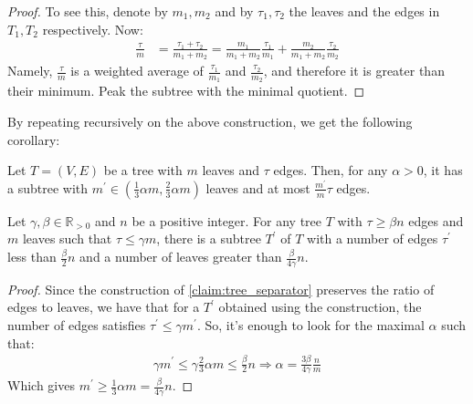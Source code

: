 \begin{proof}
To see this, denote by $m_{1},m_{2}$ and by $ \tau_{1}, \tau_{2} $ the leaves and the edges in $T_{1},T_{2}$ respectively. Now:
\begin{equation*}
  \begin{split}
    \frac{\tau}{m} &= \frac{\tau_{1} + \tau_{2} }{m_{1} + m_{2}} =  \frac{m_{1} }{m_{1} + m_{2}} \frac{\tau_{1} }{m_{1}}  + \frac{m_{2} }{m_{1} + m_{2}} \frac{\tau_{2} }{m_{2}} 
  \end{split}
\end{equation*}
Namely, $\frac{\tau}{m}$ is a weighted average of $\frac{\tau_{1}}{m_{1}}$ and $\frac{\tau_{2}}{m_{2}}$, and therefore it is greater than their minimum. Peak the subtree with the minimal quotient.
  \end{proof}
By repeating recursively on the above construction, we get the following corollary:
  \begin{corollary}
Let $T = (V,E)$ be a tree with $m$ leaves and $\tau$ edges. Then, for any $\alpha > 0$, it has a subtree with $m^{\prime} \in \left( \frac{1}{3}\alpha m, \frac{2}{3} \alpha m \right)$ leaves and at most $\frac{m^{\prime}}{m} \tau$ edges.
  \end{corollary}

  \begin{claim}
    \label{claim:big_subtree}
Let $\gamma, \beta \in \mathbb{R}_{>0}$ and $n$ be a positive integer. For any tree $T$ with $\tau \ge \beta n$ edges and $m$ leaves such that $\tau \le \gamma m$, there is a subtree $T^{\prime}$ of $T$ with a number of edges $\tau^{\prime}$ less than $\frac{\beta}{2}n$ and a number of leaves greater than $\frac{\beta}{4\gamma} n$.
  \end{claim}
\begin{proof}
Since the construction of \cref{claim:tree_separator} preserves the ratio of edges to leaves, we have that for a $T^{\prime}$ obtained using the construction, the number of edges satisfies $\tau^{\prime} \le \gamma m^{\prime}$. So, it's enough to look for the maximal $\alpha$ such that:
    \begin{equation*}
      \begin{split}
        \gamma m^{\prime}  \le \gamma \frac{2}{3}\alpha m \le \frac{\beta}{2} n \Rightarrow \alpha  = \frac{3 \beta}{4\gamma} \frac{n}{m} 
      \end{split}
    \end{equation*}
    Which gives $m^{\prime} \ge \frac{1}{3}\alpha m = \frac{\beta}{4\gamma} n$.

\end{proof}
